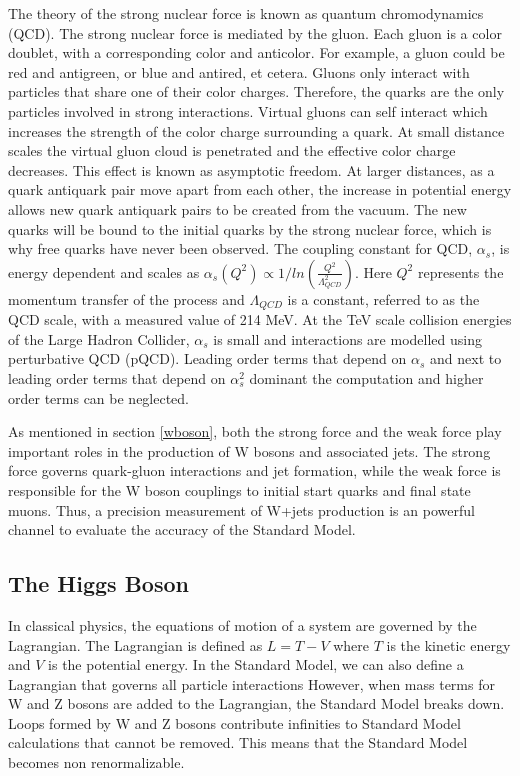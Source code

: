 \documentclass[oneside, letterpaper, oldfontcommands]{memoir}
\begin{document}
\qquad The theory of the strong nuclear force is known as quantum chromodynamics (QCD). The strong nuclear force is mediated by the gluon. Each gluon is a color doublet, with a corresponding color and anticolor. For example, a gluon could be red and antigreen, or blue and antired, et cetera. Gluons only interact with particles that share one of their color charges. Therefore, the quarks are the only particles involved in strong interactions. Virtual gluons can self interact which increases the strength of the color charge surrounding a quark. At small distance scales the virtual gluon cloud is penetrated and the effective color charge decreases. This effect is known as asymptotic freedom. \cite{Halzen:1984mc} At larger distances, as a quark antiquark pair move apart from each other, the increase in potential energy allows new quark antiquark pairs to be created from the vacuum. The new quarks will be bound to the initial quarks by the strong nuclear force, which is why free quarks have never been observed. 
\qquad The coupling constant for QCD, $\alpha_{s}$, is energy dependent and scales as $\alpha_{s}(Q^{2}) \propto 1/ln(\frac{Q^{2}}{\Lambda_{QCD}^{2}})$. Here $Q^{2}$ represents the momentum transfer of the process and $\Lambda_{QCD}$ is a constant, referred to as the QCD scale, with a measured value of 214 MeV\cite{Agashe:2014kda}. At the TeV scale collision energies of the Large Hadron Collider, $\alpha_{s}$ is small and interactions are modelled using perturbative QCD (pQCD). Leading order terms that depend on $\alpha_{s}$ and next to leading order terms that depend on $\alpha_{s}^{2}$ dominant the computation and higher order terms can be neglected.

\qquad As mentioned in section \ref{wboson}, both the strong force and the weak force play important roles in the production of W bosons and associated jets. The strong force governs quark-gluon interactions and jet formation, while the weak force is responsible for the W boson couplings to initial start quarks and final state muons. Thus, a precision measurement of W+jets production is an powerful channel to evaluate the accuracy of the Standard Model.



\subsection{The Higgs Boson}\label{higgstheory}
\qquad In classical physics, the equations of motion of a system are governed by the Lagrangian. The Lagrangian is defined as $L = T - V$ where $T$ is the kinetic energy and $V$ is the potential energy. In the Standard Model, we can also define a Lagrangian that governs all particle interactions\cite{Halzen:1984mc} However, when mass terms for W and Z bosons are added to the Lagrangian, the Standard Model breaks down. Loops formed by W and Z bosons contribute infinities to Standard Model calculations that cannot be removed. This means that the Standard Model becomes non renormalizable. 
\end{document}
